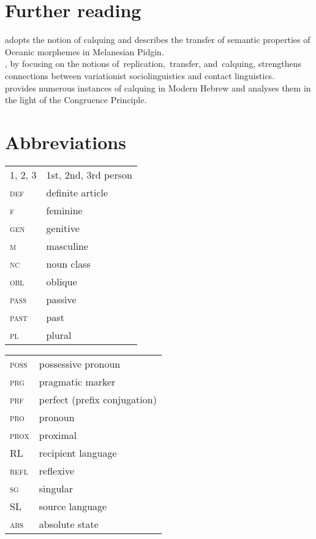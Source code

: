 \documentclass[output=paper]{langsci/langscibook}
\begin{document}
\section*{Further reading}

\citet{Keesing1988} adopts the notion of calquing and describes the transfer of semantic properties of Oceanic morphemes in Melanesian Pidgin.\\
\citet{Meyerhoff2009}, by focusing on the notions of~replication,~transfer, and~calquing, strengthens connections between variationist sociolinguistics and contact linguistics.\\
\citet{Zuckermann2009} provides numerous instances of calquing in Modern Hebrew and analyses them in the light of the Congruence Principle.

\section*{Abbreviations}

\begin{tabularx}{.5\textwidth}{@{}lQ@{}}
\textsc{1, 2, 3} & 1st, 2nd, 3rd person \\
\textsc{def} & definite article \\
\textsc{f} & feminine \\
\textsc{gen} & genitive \\
\textsc{m} & masculine \\
\textsc{nc} & noun class  \\
\textsc{obl} & oblique \\
\textsc{pass} & passive \\
\textsc{past} & past \\
\textsc{pl} & plural \\
\end{tabularx}%
\begin{tabularx}{.5\textwidth}{@{}lQ@{}}
\textsc{poss} & possessive pronoun \\
\textsc{prg} & pragmatic marker \\
\textsc{prf} & perfect (prefix conjugation) \\
\textsc{pro} & pronoun \\
\textsc{prox} & proximal \\
RL & recipient language \\
\textsc{refl} & reflexive \\
\textsc{sg} & singular \\
SL & source language \\
\textsc{abs} & absolute state \\
\end{tabularx}%






\sloppy
\printbibliography[heading=subbibliography,notkeyword=this]
\end{document}
